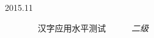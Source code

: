 \begin{tcolorbox}[colback=yellow!58!white,colframe=yellow!75!black]
    \begin{description}
        \item [2015.11] ~~汉字应用水平测试~~~~~~\emph{二级}
    \end{description}
\end{tcolorbox}